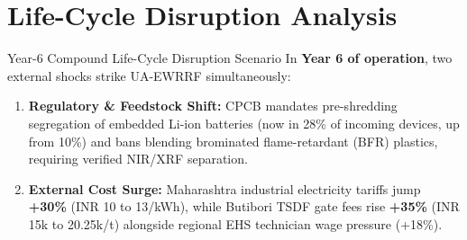 \section{Life-Cycle Disruption Analysis}
\label{sec:J}

\begin{warnbox}{Year-6 Compound Life-Cycle Disruption Scenario}
In \textbf{Year 6 of operation}, two external shocks strike UA-EWRRF simultaneously:
\begin{enumerate}
    \item \textbf{Regulatory \& Feedstock Shift:} CPCB mandates pre-shredding segregation of embedded Li-ion batteries (now in 28\% of incoming devices, up from 10\%) and bans blending brominated flame-retardant (BFR) plastics, requiring verified NIR/XRF separation.
    \item \textbf{External Cost Surge:} Maharashtra industrial electricity tariffs jump \textbf{+30\%} (INR 10 to 13/kWh), while Butibori TSDF gate fees rise \textbf{+35\%} (INR 15k to 20.25k/t) alongside regional EHS technician wage pressure (+18\%).
\end{enumerate}
\end{warnbox}

